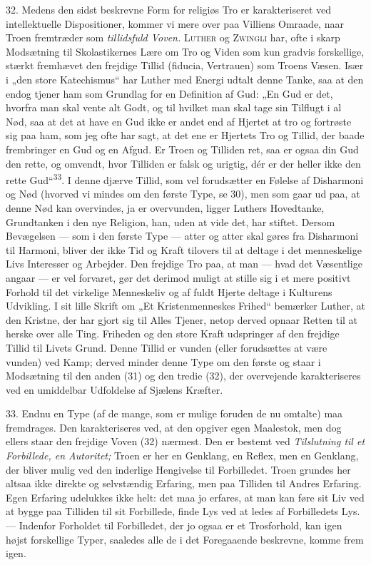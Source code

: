 \documentclass[12pt,a4paper,openany]{book}
\newcommand{\opage}[1]{\marginnote{\footnotesize\textit{[#1]}}}
\begin{document}
32. Medens den sidst beskrevne Form for religiøs Tro er karakteriseret
ved intellektuelle Dispositioner, kommer vi mere over paa Villiens
Omraade, naar Troen fremtræder som \textit{tillidsfuld Voven.}
\textsc{Luther} og \textsc{Zwingli} har, ofte i skarp Modsætning til
Skolastikernes Lære om Tro og Viden som kun gradvis forskellige, stærkt
fremhævet den frejdige Tillid (fiducia, Vertrauen) som Troens Væsen.
Især i „den store Katechismus“ har Luther med Energi udtalt denne Tanke,
saa at den endog tjener ham som Grundlag for en Definition af Gud: „En
Gud er det, hvorfra man skal vente
\opage{78}alt Godt, og til hvilket man skal tage sin Tilflugt i al Nød,
saa at det at have en Gud ikke er andet end af Hjertet at tro og
fortrøste sig paa ham, som jeg ofte har sagt, at det ene er Hjertets Tro
og Tillid, der baade frembringer en Gud og en Afgud. Er Troen og
Tilliden ret, saa er ogsaa din Gud den rette, og omvendt, hvor Tilliden
er falsk og urigtig, dér er der heller ikke den rette
Gud“\textsuperscript{33}. I denne djærve Tillid, som vel forudsætter en
Følelse af Disharmoni og Nød (hvorved vi mindes om den første Type, se
30), men som gaar ud paa, at denne Nød kan overvindes, ja er overvunden,
ligger Luthers Hovedtanke, Grundtanken i den nye Religion, han, uden at
vide det, har stiftet. Dersom Bevægelsen --- som i den første Type ---
atter og atter skal gøres fra Disharmoni til Harmoni, bliver der ikke
Tid og Kraft tilovers til at deltage i det menneskelige Livs Interesser
og Arbejder. Den frejdige Tro paa, at man --- hvad det Væsentlige angaar
--- er vel forvaret, gør det derimod muligt at stille sig i et mere
positivt Forhold til det virkelige Menneskeliv og af fuldt Hjerte
deltage i Kulturens Udvikling. I sit lille Skrift om „Et
Kristenmenneskes Frihed“ bemærker Luther, at den Kristne, der har gjort
sig til Alles Tjener, netop derved opnaar Retten til at herske over alle
Ting. Friheden og den store Kraft udspringer af den frejdige Tillid til
Livets Grund. Denne Tillid er vunden (eller forudsættes at være vunden)
ved Kamp; derved minder denne Type om den første og staar i Modsætning
til den anden (31) og den tredie (32), der overvejende karakteriseres
ved en umiddelbar Udfoldelse af Sjælens Kræfter.

33. Endnu en Type (af de mange, som er mulige foruden de nu omtalte) maa
fremdrages. Den karakteriseres ved, at den opgiver egen Maalestok, men
dog ellers staar den frejdige Voven (32) nærmest. Den er bestemt ved
\textit{Tilslutning til et Forbillede, en Autoritet;} Troen er her en
Genklang, en Reflex, men en Genklang, der bliver mulig ved den inderlige
Hengivelse til Forbilledet. Troen grundes her altsaa ikke direkte og
selvstændig Erfaring, men paa Tilliden til Andres Erfaring. Egen
Erfaring udelukkes ikke helt: det maa jo erfares, at man kan føre sit
Liv ved at bygge paa Tilliden til sit Forbillede, finde Lys ved at ledes
af Forbilledets Lys. --- Indenfor Forholdet til Forbilledet, der jo
ogsaa er et Trosforhold, kan igen højst forskellige Typer, saaledes alle
de i det Foregaaende beskrevne, komme frem igen.
\end{document}
